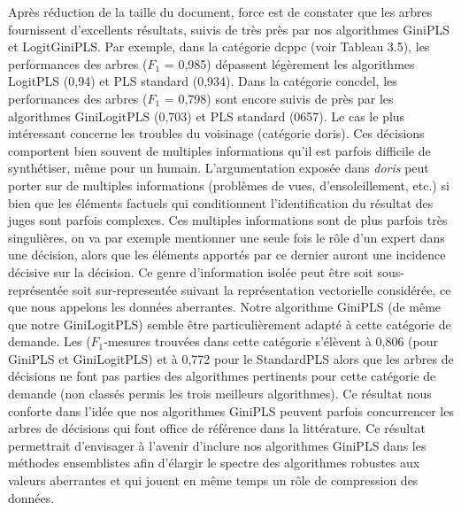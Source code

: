 Après réduction de la taille du document, force est de constater que les arbres fournissent
d'excellents résultats, suivis de très près par nos algorithmes GiniPLS et LogitGiniPLS. Par
exemple, dans la catégorie dcppc (voir Tableau 3.5), les performances des arbres ($F_1$ = 0,985)
dépassent légèrement les algorithmes LogitPLS (0,94) et PLS standard (0,934). Dans la
catégorie concdel, les performances des arbres ($F_1$ = 0,798) sont encore suivis de près par les
algorithmes GiniLogitPLS (0,703) et PLS standard (0657). Le cas le plus intéressant concerne
les troubles du voisinage (catégorie doris). Ces décisions comportent bien souvent de
multiples informations qu'il est parfois difficile de synthétiser, même pour un humain.
L'argumentation exposée dans \textit{doris} peut porter sur de multiples informations (problèmes de
vues, d'ensoleillement, etc.) si bien que les éléments factuels qui conditionnent l'identification du résultat des
juges sont parfois complexes. Ces multiples informations sont de plus parfois très singulières,
on va par exemple mentionner une seule fois le rôle d'un expert dans une décision, alors que
les éléments apportés par ce dernier auront une incidence décisive sur la décision. Ce genre
d'information isolée peut être soit sous-représentée soit sur-representée suivant la
représentation vectorielle considérée, ce que nous appelons les données aberrantes. Notre
algorithme GiniPLS (de même que notre GiniLogitPLS) semble être particulièrement adapté à
cette catégorie de demande. Les ($F_1$-mesures trouvées dans cette catégorie s'élèvent à 0,806
(pour GiniPLS et GiniLogitPLS) et à 0,772 pour le StandardPLS alors que les arbres de
décisions ne font pas parties des algorithmes pertinents pour cette catégorie de demande (non
classés permis les trois meilleurs algorithmes). Ce résultat nous conforte dans l'idée que nos
algorithmes GiniPLS peuvent parfois concurrencer les arbres de décisions qui font office de
référence dans la littérature. Ce résultat permettrait d'envisager à l'avenir d'inclure nos
algorithmes GiniPLS dans les méthodes ensemblistes afin d'élargir le spectre des algorithmes
robustes aux valeurs aberrantes et qui jouent en même temps un rôle de compression des
données.

